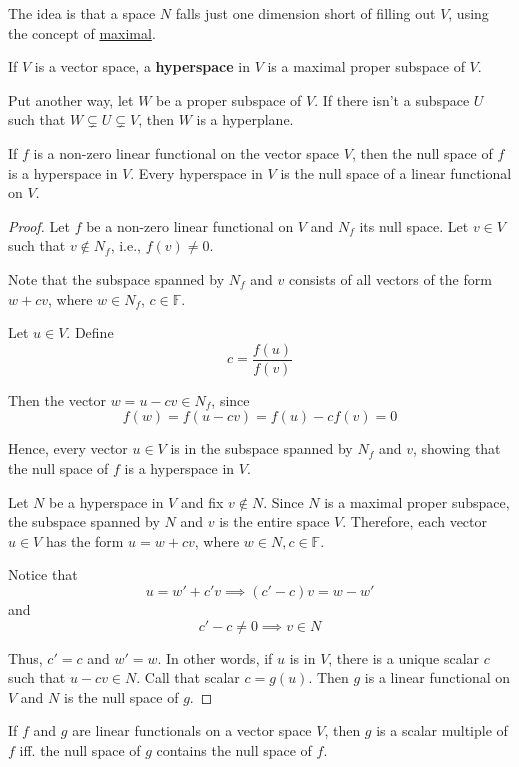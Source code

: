 The idea is that a space $N$ falls just one dimension short of filling out $V$, using the concept of \hyperref[def:maximal]{maximal}.

\begin{definition}[Hyperspace]
	If $V$ is a vector space, a \textbf{hyperspace} in $V$ is a maximal proper subspace of $V$.
\end{definition}

Put another way, let $W$ be a proper subspace of $V$. If there isn't a subspace $U$ such that $W \subsetneq U \subsetneq V$, then $W$ is a hyperplane.

\begin{theorem}
	If $f$ is a non-zero linear functional on the vector space $V$, then the null space of $f$ is a hyperspace in $V$. Every hyperspace in $V$ is the null space of a linear functional on $V$.
\end{theorem}

\begin{proof}
	Let $f$ be a non-zero linear functional on $V$ and $N_f$ its null space. Let $v \in V$ such that $v \notin N_f$, i.e., $f(v) \neq 0$.

	Note that the subspace spanned by $N_f$ and $v$ consists of all vectors of the form $w + cv$, where $w \in N_f$, $c \in \mathbb{F}$.

	Let $u \in V$. Define 
	\[
		c = \frac{f(u)}{f(v)}
	\]

	Then the vector $w = u - cv \in N_f$, since
	\[
		f(w) = f(u - cv) = f(u) - cf(v) = 0
	\]
	
	Hence, every vector $u \in V$ is in the subspace spanned by $N_f$ and $v$, showing that the null space of $f$ is a hyperspace in $V$.

	Let $N$ be a hyperspace in $V$ and fix $v \notin N$. Since $N$ is a maximal proper subspace, the subspace spanned by $N$ and $v$ is the entire space $V$. Therefore, each vector $u \in V$ has the form $u = w + cv$, where $w \in N, c \in \mathbb{F}$.

	Notice that
	\[
		u = w' + c'v \implies (c'-c)v = w - w'
	\]
	and
	\[
		c' - c \neq 0 \implies v \in N
	\]	
	
	Thus, $c' = c$ and $w' = w$. In other words, if $u$ is in $V$, there is a unique scalar $c$ such that $u - cv \in N$. Call that scalar $c = g(u)$. Then $g$ is a linear functional on $V$ and $N$ is the null space of $g$.
\end{proof}

\begin{lemma}
	If $f$ and $g$ are linear functionals on a vector space $V$, then $g$ is a scalar multiple of $f$ iff. the null space of $g$ contains the null space of $f$.
\end{lemma}

